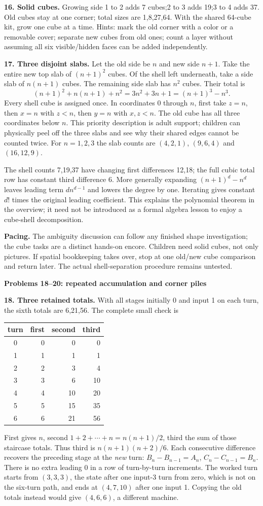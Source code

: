 \documentclass[11pt]{article}
\newcommand{\heading}[1]{\par\textbf{#1}\par}
\begin{document}
\textbf{16. Solid cubes.} Growing side 1 to 2 adds 7 cubes;2 to 3 adds 19;3 to 4 adds 37. Old cubes stay at one corner; total sizes are 1,8,27,64. With the shared 64-cube kit, grow one cube at a time. Hints: mark the old corner with a color or a removable cover; separate new cubes from old ones; count a layer without assuming all six visible/hidden faces can be added independently.

\textbf{17. Three disjoint slabs.} Let the old side be $n$ and new side $n+1$. Take the entire new top slab of $(n+1)^2$ cubes. Of the shell left underneath, take a side slab of $n(n+1)$ cubes. The remaining side slab has $n^2$ cubes. Their total is
\[(n+1)^2+n(n+1)+n^2=3n^2+3n+1=(n+1)^3-n^3.\]
Every shell cube is assigned once. In coordinates 0 through $n$, first take $z=n$, then $x=n$ with $z<n$, then $y=n$ with $x,z<n$. The old cube has all three coordinates below $n$. This priority description is adult support; children can physically peel off the three slabs and see why their shared edges cannot be counted twice. For $n=1,2,3$ the slab counts are $(4,2,1)$, $(9,6,4)$ and $(16,12,9)$.

The shell counts 7,19,37 have changing first differences 12,18; the full cubic total row has constant third difference 6. More generally expanding $(n+1)^d-n^d$ leaves leading term $d n^{d-1}$ and lowers the degree by one. Iterating gives constant $d!$ times the original leading coefficient. This explains the polynomial theorem in the overview; it need not be introduced as a formal algebra lesson to enjoy a cube-shell decomposition.

\textbf{Pacing.} The ambiguity discussion can follow any finished shape investigation; the cube tasks are a distinct hands-on encore. Children need solid cubes, not only pictures. If spatial bookkeeping takes over, stop at one old/new cube comparison and return later. The actual shell-separation procedure remains untested.
\newpage
\heading{Problems 18--20: repeated accumulation and corner piles}
\textbf{18. Three retained totals.} With all stages initially 0 and input 1 on each turn, the sixth totals are 6,21,56. The complete small check is
\begin{center}\begin{tabular}{c|rrr}
turn&first&second&third\\\hline
0&0&0&0\\
1&1&1&1\\
2&2&3&4\\
3&3&6&10\\
4&4&10&20\\
5&5&15&35\\
6&6&21&56
\end{tabular}\end{center}
First gives $n$, second $1+2+\cdots+n=n(n+1)/2$, third the sum of those staircase totals. Thus third is $n(n+1)(n+2)/6$. Each consecutive difference recovers the preceding stage at the \emph{new} turn: $B_n-B_{n-1}=A_n$, $C_n-C_{n-1}=B_n$. There is no extra leading 0 in a row of turn-by-turn increments. The worked turn starts from $(3,3,3)$, the state after one input-3 turn from zero, which is not on the six-turn path, and ends at $(4,7,10)$ after one input 1. Copying the old totals instead would give $(4,6,6)$, a different machine.
\end{document}
